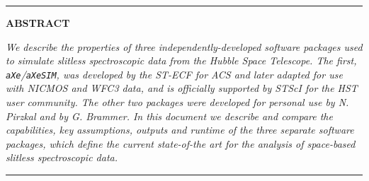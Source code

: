 \documentclass[12pt]{article}
\begin{document}
\hrule height 1.5pt
\smallskip
\noindent \large{\bf A}\footnotesize{\bf BSTRACT}

\noindent\normalsize{\textit{We describe the properties of three independently-developed software packages used to simulate slitless spectroscopic data from the Hubble Space Telescope.  The first, \texttt{aXe}/\texttt{aXeSIM}, was developed by the ST-ECF for ACS and later adapted for use with NICMOS and WFC3 data,  and is officially supported by STScI for the \textit{HST} user community.  The other two packages were developed for personal use by N. Pirzkal and by G. Brammer.  In this document we describe and compare the capabilities, key assumptions, outputs and runtime of the three separate software packages, which define the current state-of-the art for the analysis of space-based slitless spectroscopic data.}}

\smallskip
\medskip
\hrule height 1.5pt





%     

\end{document}
